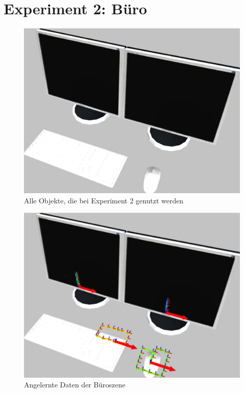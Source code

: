 \section{Experiment 2: Büro}
\begin{figure}
	\centering
	\includegraphics[width=12cm]{bilder/allobjectsbuero.pdf}
	\caption{Alle Objekte, die bei Experiment 2 genutzt werden \cite{gassner17}}
	\label{img:allobjectsbuero}
\end{figure}
\begin{figure}
	\centering
	\includegraphics[width=12cm]{bilder/evaluationbueroszene.pdf}
	\caption{Angelernte Daten der B{\"u}roszene \cite{gassner17}}
	\label{img:buero}
\end{figure}
